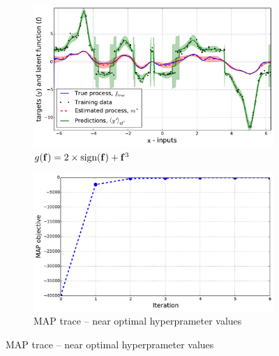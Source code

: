 \documentclass{article} %
\begin{document}
\begin{figure}[tb]
    \begin{subfigure}[b]{0.5\linewidth}
        \includegraphics[width=\linewidth]{fig/signdemo}
        \caption{$g\!\left({{\mathbf{f}}}\right) = 2\times\text{sign}\!\left({\mathbf{f}}\right)
            + \mathbf{f}^3$}
        \label{sub:sign}
    \end{subfigure}
    \begin{subfigure}[b]{0.5\linewidth}
        \includegraphics[width=\linewidth]{fig/trace_end}
        \caption{MAP trace -- near optimal hyperprameter values}
        \label{sub:mape}
        \vspace{1.5mm}
    \end{subfigure}


\end{figure}
\end{document}
